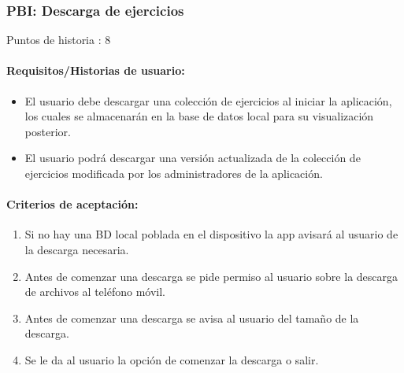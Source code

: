 \documentclass[11pt,a4paper]{report}
\begin{document}
\subsubsection{PBI: Descarga de ejercicios}
Puntos de historia : 8
\paragraph{Requisitos/Historias de usuario:}
\begin{itemize}
	\item El usuario debe descargar una colección de ejercicios al iniciar la aplicación, los cuales se almacenarán en la base de datos local para su visualización posterior.
	\item El usuario podrá descargar una versión actualizada de la colección de ejercicios modificada por los administradores de la aplicación.
\end{itemize}
\paragraph{Criterios de aceptación:}
\begin{enumerate}
	\item Si no hay una BD local poblada en el dispositivo la app avisará al usuario de la
	descarga necesaria.
	\item Antes de comenzar una descarga se pide permiso al usuario sobre la descarga de archivos al teléfono móvil.
	\item Antes de comenzar una descarga se avisa al usuario del tamaño de la descarga.
	\item Se le da al usuario la opción de comenzar la descarga o salir.
\end{enumerate}
\end{document}
